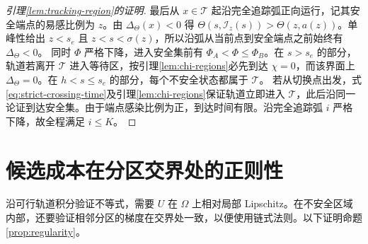 \documentclass[lang=cn,a4paper,newtx]{elegantpaper}
\theoremstyle{plain}
\theoremstyle{definition}
\begin{document}
\begin{proof}[引理\ref{lem:tracking-region}的证明]
最后从 $x\in\mathcal T$ 起沿完全追踪弧正向运行，记其安全端点的易感比例为 $z$。由 $\Delta_\Theta(x)<0$ 得 $\Theta(s,\mathcal I_z(s))>\Theta(z,a(z))$。单峰性给出 $z<s_e$ 且 $z<s<\sigma(z)$，所以沿弧从当前点到安全端点之前始终有 $\Delta_\Theta<0$。
同时 $\Phi$ 严格下降，进入安全集前有 $\Phi_A<\Phi\le\Phi_B$。在 $s>s_e$ 的部分，轨道若离开 $\mathcal T$ 进入等待区，按引理\ref{lem:chi-regions}必先到达 $\chi=0$，而该界面上 $\Delta_\Theta=0$。在 $h<s\le s_e$ 的部分，每个不安全状态都属于 $\mathcal T$。
若从切换点出发，式\eqref{eq:strict-crossing-time}及引理\ref{lem:chi-regions}保证轨道立即进入 $\mathcal T$，此后沿同一论证到达安全集。由于端点感染比例为正，到达时间有限。沿完全追踪弧 $i$ 严格下降，故全程满足 $i\le K$。
\end{proof}

\section{候选成本在分区交界处的正则性}
\label{app:regularity-proof}
沿可行轨道积分验证不等式，需要 $U$ 在 $\Omega$ 上相对局部 Lipschitz。在不安全区域内部，还要验证相邻分区的梯度在交界处一致，以便使用链式法则。以下证明命题\ref{prop:regularity}。
\end{document}
